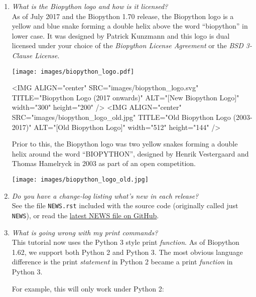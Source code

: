 \begin{enumerate}
  \item \emph{What is the Biopython logo and how is it licensed?} \\
  As of July 2017 and the Biopython 1.70 release, the Biopython logo is a
  yellow and blue snake forming a double helix above the word ``biopython''
  in lower case. It was designed by Patrick Kunzmann and this logo is dual
  licensed under your choice of the \emph{Biopython License Agreement} or
  the \emph{BSD 3-Clause License}.

\begin{latexonly}
  \texttt{[image: images/biopython\_logo.pdf]}\\
\end{latexonly}
\begin{rawhtml}
  <IMG ALIGN="center" SRC="images/biopython_logo.svg" TITLE="Biopython Logo (2017 onwards)" ALT="[New Biopython Logo]" width="300" height="200" />
  <IMG ALIGN="center" SRC="images/biopython_logo_old.jpg" TITLE="Old Biopython Logo (2003-2017)" ALT="[Old Biopython Logo]" width="512" height="144" />
\end{rawhtml}

  Prior to this, the Biopython logo was two yellow snakes forming a double
  helix around the word ``BIOPYTHON'', designed by Henrik Vestergaard and
  Thomas Hamelryck in 2003 as part of an open competition.

\begin{latexonly}
  \texttt{[image: images/biopython\_logo\_old.jpg]}\\
\end{latexonly}

  \item \emph{Do you have a change-log listing what's new in each release?} \\
  See the file \verb|NEWS.rst| included with the source code (originally called
  just \verb|NEWS|), or read the
  \href{https://github.com/biopython/biopython/blob/master/NEWS.rst}{latest NEWS file on GitHub}.

  \item \emph{What is going wrong with my print commands?} \\
  This tutorial now uses the Python 3 style print \emph{function}.
  As of Biopython 1.62, we support both Python 2 and Python 3.
  The most obvious language difference is the print \emph{statement}
  in Python 2 became a print \emph{function} in Python 3.

  For example, this will only work under Python 2:


\end{enumerate}
